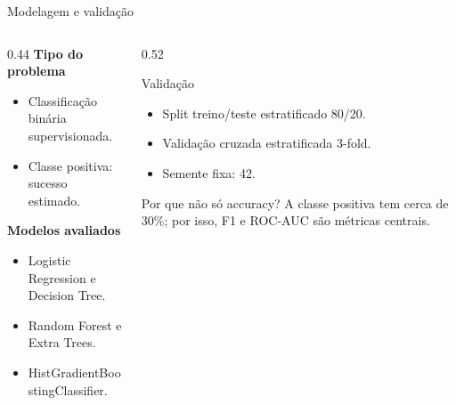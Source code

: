 \documentclass[aspectratio=169]{beamer}
\begin{document}
\begin{frame}{Modelagem e validação}
\small
\begin{columns}[T,onlytextwidth]
  \begin{column}{0.44\textwidth}
    \textbf{Tipo do problema}
    \begin{itemize}
      \item Classificação binária supervisionada.
      \item Classe positiva: sucesso estimado.
    \end{itemize}

    \vspace{0.05cm}

    \textbf{Modelos avaliados}
    \begin{itemize}
      \item Logistic Regression e Decision Tree.
      \item Random Forest e Extra Trees.
      \item HistGradientBoostingClassifier.
    \end{itemize}
  \end{column}

  \begin{column}{0.52\textwidth}
    \begin{block}{Validação}
      \begin{itemize}
        \item Split treino/teste estratificado 80/20.
        \item Validação cruzada estratificada 3-fold.
        \item Semente fixa: 42.
      \end{itemize}
    \end{block}

    \begin{exampleblock}{Por que não só accuracy?}
      \small
      A classe positiva tem cerca de 30\%; por isso, F1 e ROC-AUC são métricas centrais.
    \end{exampleblock}
  \end{column}
\end{columns}
\end{frame}
\end{document}
